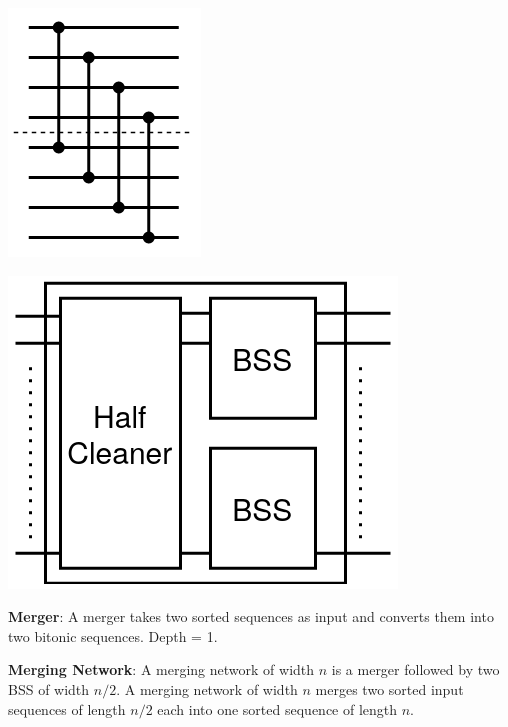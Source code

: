 \documentclass[a4paper, 8pt, landscape]{scrartcl}
\begin{document}
\begin{multicols*}{3}
\vspace*{-1mm}
\begin{minipage}{0.5\columnwidth}
	\centering
	\includegraphics[width=0.47\columnwidth]{source/halfcleaner}
\end{minipage}%
\begin{minipage}{0.5\columnwidth}
	\centering
	\includegraphics[width=0.75\columnwidth]{source/bss}
\end{minipage}
\vspace*{-1mm}

\textbf{Merger}: A merger takes two sorted sequences as input and converts them into two bitonic sequences. Depth = 1.

\textbf{Merging Network}: A merging network of width $n$ is a merger followed by two BSS of width $n/2$. A merging network of width $n$ merges two sorted input sequences of length $n/2$ each into one sorted sequence of length $n$.


\end{multicols*}
\end{document}
